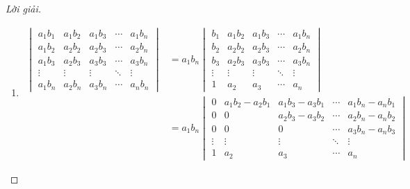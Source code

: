 \begin{proof}[Lời giải]
    \begin{enumerate}[label = (\alph*)]
        \item
              \begin{align*}
                  \begin{vmatrix}
                      a_{1}b_{1} & a_{1}b_{2} & a_{1}b_{3} & \cdots & a_{1}b_{n} \\
                      a_{1}b_{2} & a_{2}b_{2} & a_{2}b_{3} & \cdots & a_{2}b_{n} \\
                      a_{1}b_{3} & a_{2}b_{3} & a_{3}b_{3} & \cdots & a_{3}b_{n} \\
                      \vdots     & \vdots     & \vdots     & \ddots & \vdots     \\
                      a_{1}b_{n} & a_{2}b_{n} & a_{3}b_{n} & \cdots & a_{n}b_{n}
                  \end{vmatrix}
                   & =
                  a_{1}b_{n}
                  \begin{vmatrix}
                      b_{1}  & a_{1}b_{2} & a_{1}b_{3} & \cdots & a_{1}b_{n} \\
                      b_{2}  & a_{2}b_{2} & a_{2}b_{3} & \cdots & a_{2}b_{n} \\
                      b_{3}  & a_{2}b_{3} & a_{3}b_{3} & \cdots & a_{3}b_{n} \\
                      \vdots & \vdots     & \vdots     & \ddots & \vdots     \\
                      1      & a_{2}      & a_{3}      & \cdots & a_{n}
                  \end{vmatrix}                                            \\
                   & =
                  a_{1}b_{n}
                  \begin{vmatrix}
                      0      & a_{1}b_{2} - a_{2}b_{1} & a_{1}b_{3} - a_{3}b_{1} & \cdots & a_{1}b_{n} - a_{n}b_{1} \\
                      0      & 0                       & a_{2}b_{3} - a_{3}b_{2} & \cdots & a_{2}b_{n} - a_{n}b_{2} \\
                      0      & 0                       & 0                       & \cdots & a_{3}b_{n} - a_{n}b_{3} \\
                      \vdots & \vdots                  & \vdots                  & \ddots & \vdots                  \\
                      1      & a_{2}                   & a_{3}                   & \cdots & a_{n}

\end{vmatrix}
\end{align*}
\end{enumerate}
\end{proof}
